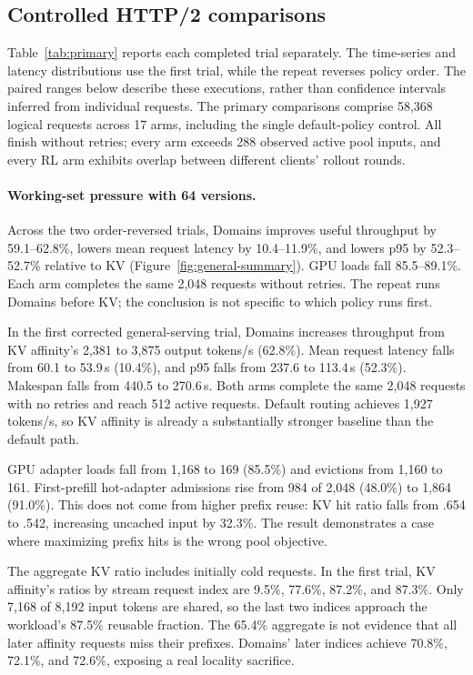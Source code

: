 \subsection{Controlled HTTP/2 comparisons}

Table~\ref{tab:primary} reports each completed trial separately. The time-series
and latency distributions use the first trial, while the repeat reverses policy
order. The paired ranges below describe these executions, rather than confidence
intervals inferred from individual requests.
The primary comparisons comprise 58,368 logical requests across 17 arms,
including the single default-policy control. All finish without retries; every
arm exceeds 288 observed active pool inputs, and every RL arm exhibits overlap
between different clients' rollout rounds.

\paragraph{Working-set pressure with 64 versions.}
Across the two order-reversed trials, Domains improves useful throughput by
59.1--62.8\%, lowers mean request latency by 10.4--11.9\%, and lowers p95 by
52.3--52.7\% relative to KV (Figure~\ref{fig:general-summary}). GPU loads fall
85.5--89.1\%. Each arm completes the same 2,048 requests without retries.
The repeat runs Domains before KV; the conclusion is not specific to which
policy runs first.

In the first corrected general-serving trial, Domains increases throughput
from KV affinity's 2,381 to 3,875 output tokens/s (62.8\%). Mean request latency
falls from 60.1 to 53.9\,s (10.4\%), and p95 falls from 237.6 to 113.4\,s
(52.3\%). Makespan falls from 440.5 to 270.6\,s. Both arms complete the same
2,048 requests with no retries and reach 512 active requests. Default routing
achieves 1,927 tokens/s, so KV affinity is already a substantially stronger
baseline than the default path.

GPU adapter loads fall from 1,168 to 169 (85.5\%) and evictions from 1,160 to
161. First-prefill hot-adapter admissions rise from 984 of 2,048 (48.0\%) to
1,864 (91.0\%). This does not come from higher prefix reuse: KV hit ratio falls
from .654 to .542, increasing uncached input by 32.3\%. The result demonstrates
a case where maximizing prefix hits is the wrong pool objective.

The aggregate KV ratio includes initially cold requests. In the first trial,
KV affinity's ratios by stream request index are 9.5\%, 77.6\%, 87.2\%, and
87.3\%. Only 7,168 of 8,192 input tokens are shared, so the last two indices
approach the workload's 87.5\% reusable fraction. The 65.4\% aggregate is not
evidence that all later affinity requests miss their prefixes. Domains' later
indices achieve 70.8\%, 72.1\%, and 72.6\%, exposing a real locality sacrifice.

